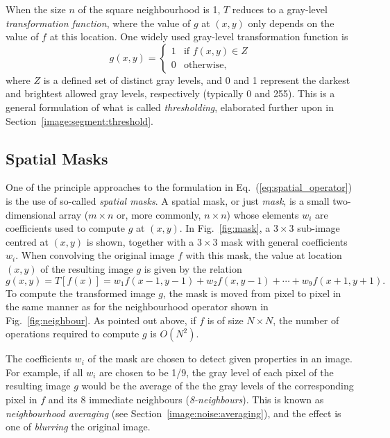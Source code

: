 When the size $n$ of the square neighbourhood is 1, $T$ reduces to a
gray-level {\em transformation function\/}, where the value of $g$ at
$(x,y)$ only depends on the value of $f$ at this location.  One widely
used gray-level transformation function is
\begin{equation}
\label{eq:threshold:1}
  g(x,y)=\left\{ \begin{array}{ll} 
                   1 & \mbox{if $f(x,y)\in Z$} \\ 
                   0 & \mbox{otherwise,}
                 \end{array} \right.
\end{equation}
where $Z$ is a defined set of distinct gray levels, and 0 and 1
represent the darkest and brightest allowed gray levels, respectively
(typically 0 and 255).  This is a general formulation of what is
called {\em thresholding\/}, elaborated further upon in
Section~\ref{image:segment:threshold}.

\subsection{Spatial Masks}
\label{image:spatial:mask}

One of the principle approaches to the formulation in
Eq.~(\ref{eq:spatial_operator}) is the use of so-called {\em spatial
  masks\/}.  A spatial mask, or just {\em mask\/}, is a small
two-dimensional array ($m\times n$ or, more commonly, $n\times n$)
whose elements $w_{i}$ are coefficients used to compute $g$ at
$(x,y)$.  In Fig.~\ref{fig:mask}, a $3\times 3$ sub-image centred at
$(x,y)$ is shown, together with a $3\times 3$ mask with general
coefficients $w_{i}$.  When convolving the original image $f$ with
this mask, the value at location $(x,y)$ of the resulting image $g$ is
given by the relation
\begin{equation}
\label{eq:mask}
g(x,y)=T[f(x)]=w_{1}f(x-1,y-1)+w_{2}f(x,y-1)+\cdots+w_{9}f(x+1,y+1)\mbox{.}
\end{equation}
To compute the transformed image $g$, the mask is moved from pixel to
pixel in the same manner as for the neighbourhood operator shown in
Fig.~\ref{fig:neighbour}.  As pointed out above, if $f$ is of size
$N\times N$, the number of operations required to compute $g$ is
$O(N^{2})$.

The coefficients $w_{i}$ of the mask are chosen to detect given
properties in an image.  For example, if all $w_{i}$ are chosen to be
1/9, the gray level of each pixel of the resulting image $g$ would be
the average of the the gray levels of the corresponding pixel in $f$
and its 8 immediate neighbours ({\em 8-neighbours\/}).  This is known
as {\em neighbourhood averaging\/} (see
Section~\ref{image:noise:averaging}), and the effect is one of {\em
  blurring\/} the original image.

